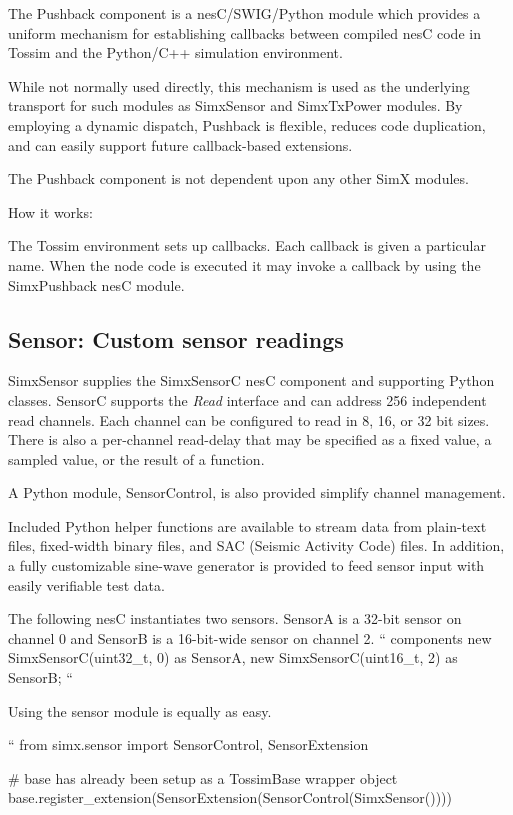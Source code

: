 The Pushback component is a nesC/SWIG/Python module which provides a
uniform mechanism for establishing callbacks between compiled nesC
code in Tossim and the Python/C++ simulation environment.

While not normally used directly, this mechanism is used as the
underlying transport for such modules as SimxSensor and SimxTxPower
modules. By employing a dynamic dispatch, Pushback is flexible,
reduces code duplication, and can easily support future callback-based
extensions.

The Pushback component is not dependent upon any other SimX modules.

How it works:

The Tossim environment sets up callbacks. Each callback is given a
particular name. When the node code is executed it may invoke a
callback by using the SimxPushback nesC module.

\subsection{Sensor: Custom sensor readings}

SimxSensor supplies the SimxSensorC nesC component and supporting
Python classes. SensorC supports the {\em Read} interface and can
address 256 independent read channels. Each channel can be configured
to read in 8, 16, or 32 bit sizes. There is also a per-channel
read-delay that may be specified as a fixed value, a sampled value, or
the result of a function.

A Python module, SensorControl, is also provided simplify channel
management.

Included Python helper functions are available to stream data from
plain-text files, fixed-width binary files, and SAC (Seismic Activity
Code) files. In addition, a fully customizable sine-wave generator is
provided to feed sensor input with easily verifiable test data.

The following nesC instantiates two sensors. SensorA is a 32-bit sensor on channel 0 and SensorB is a 16-bit-wide sensor on channel 2.
``
components
  new SimxSensorC(uint32_t, 0) as SensorA,
  new SimxSensorC(uint16_t, 2) as SensorB;
``

Using the sensor module is equally as easy.

``
from simx.sensor import SensorControl, SensorExtension

# base has already been setup as a TossimBase wrapper object
base.register_extension(SensorExtension(SensorControl(SimxSensor())))

